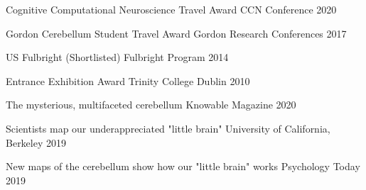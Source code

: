 \begin{cvhonors}
  
 \cvhonor
   {Cognitive Computational Neuroscience Travel Award}
   {CCN Conference}
   {} %
   {2020}
   
 \cvhonor
   {Gordon Cerebellum Student Travel Award}
   {Gordon Research Conferences}
   {} %
   {2017}
     
 \cvhonor
   {US Fulbright (Shortlisted)}
   {Fulbright Program}
   {} %
   {2014}
   
  \cvhonor
   {Entrance Exhibition Award}
   {Trinity College Dublin}
   {} %
   {2010}

\end{cvhonors}


\begin{cvhonors}

  \cvhonor
    {The mysterious, multifaceted cerebellum} %
    {Knowable Magazine}
    {} %
    {2020}

  \cvhonor
    {Scientists map our underappreciated "little brain"} %
    {University of California, Berkeley}
    {} %
    {2019}
    
  \cvhonor
    {New maps of the cerebellum show how our "little brain" works} %
    {Psychology Today}
    {} %
    {2019}

\end{cvhonors}